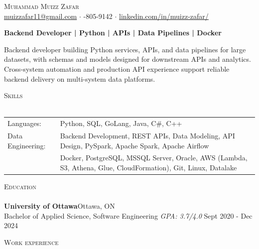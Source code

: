 \documentclass[a4paper]{article}
\newcommand{\lineunder} {
    \vspace*{-8pt} \\
    \hspace*{-18pt} \hrulefill \\
}
\newcommand{\header} [1] {
    {\hspace*{-18pt}\vspace*{6pt} \textsc{#1}}
    \vspace*{-6pt} \lineunder
}
\begin{document}
\vspace*{-40pt}

\vspace*{-10pt}
\begin{center}
	{\Huge \scshape {Muhammad Muizz Zafar}}\\
	\faSend \space \href{mailto:muizzafar11@gmail.com}{muizzafar11@gmail.com} $\cdot$ \faPhoneSquare {}-805-9142 $\cdot$ \faLinkedinSquare \space \href{https://www.linkedin.com/in/muizz-zafar/}{linkedin.com/in/muizz-zafar/}
	\\
\end{center}

\vspace{-5pt}
\begin{center}
\textbf{Backend Developer | Python | APIs | Data Pipelines | Docker}
\end{center}
\begin{center}
Backend developer building Python services, APIs, and data pipelines for large datasets, with schemas and models designed for downstream APIs and analytics. Cross-system automation and production API experience support reliable backend delivery on multi-system data platforms.
\end{center}

\header{Skills}
\begin{tabular}{ l l }
	Languages: 
& Python, SQL, GoLang, Java, C\#, C++ \\

Data Engineering: 
& Backend Development, REST APIs, Data Modeling, API Design, PySpark, Apache Spark, Apache Airflow\\
& Docker, PostgreSQL, MSSQL Server, Oracle, AWS (Lambda, S3, Athena, Glue, CloudFormation), Git, Linux, Datalake

\end{tabular}

\header{Education}
\textbf{University of Ottawa}\hfill Ottawa, ON\\
Bachelor of Applied Science, Software Engineering \textit{GPA: 3.7/4.0} \hfill Sept 2020 - Dec 2024\\
\vspace{2mm}

\header{Work experience}
\vspace{1.5mm}
\end{document}
